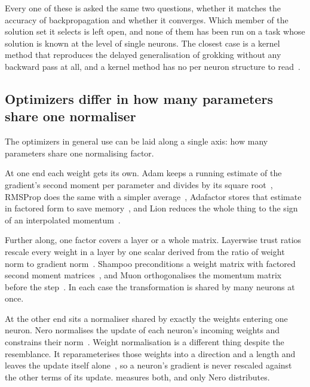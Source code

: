 Every one of these is asked the same two questions, whether it matches the
accuracy of backpropagation and whether it converges. Which member of the
solution set it selects is left open, and none of them has been run on a task
whose solution is known at the level of single neurons. The closest case is a
kernel method that reproduces the delayed generalisation of grokking without
any backward pass at all, and a kernel method has no per neuron structure to
read~\cite{mallinar_emergence_2025}.

\subsection{Optimizers differ in how many parameters share one normaliser}
\label{sec:bg_grain}

The optimizers in general use can be laid along a single axis: how many
parameters share one normalising factor.

At one end each weight gets its own. Adam keeps a running estimate of the
gradient's second moment per parameter and divides by its square
root~\cite{kingma_adam_2015}, RMSProp does the same with a simpler
average~\cite{tieleman_lecture_2012}, Adafactor stores that estimate in
factored form to save memory~\cite{shazeer_adafactor_2018}, and Lion reduces
the whole thing to the sign of an interpolated
momentum~\cite{chen_lion_2024}.

Further along, one factor covers a layer or a whole matrix. Layerwise trust
ratios rescale every weight in a layer by one scalar derived from the ratio of
weight norm to gradient norm~\cite{you_batch_2017, you_batch_2020}. Shampoo
preconditions a weight matrix with factored second moment
matrices~\cite{gupta_shampoo_2018}, and Muon orthogonalises the momentum
matrix before the step~\cite{jordan_muon_2024}. In each case the transformation
is shared by many neurons at once.

At the other end sits a normaliser shared by exactly the weights entering one
neuron. Nero normalises the update of each neuron's incoming weights and
constrains their norm~\cite{liu_learning_2021}. Weight normalisation is a different
thing despite the resemblance. It reparameterises those weights into a direction and a
length and leaves the update itself alone~\cite{salimans_weight_2016}, so a
neuron's gradient is never rescaled against the other terms of its update.
 measures both, and only Nero distributes.

